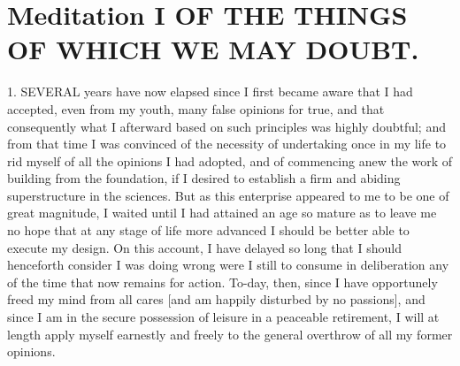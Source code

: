 
\section{Meditation I OF THE THINGS OF WHICH WE MAY DOUBT.}

1. SEVERAL years have now elapsed since I first became aware that I had accepted, even from my youth, many false opinions for true, and that consequently what I afterward based on such principles was highly doubtful; and from that time I was convinced of the necessity of undertaking once in my life to rid myself of all the opinions I had adopted, and of commencing anew the work of building from the foundation, if I desired to establish a firm and abiding superstructure in the sciences. But as this enterprise appeared to me to be one of great magnitude, I waited until I had attained an age so mature as to leave me no hope that at any stage of life more advanced I should be better able to execute my design. On this account, I have delayed so long that I should henceforth consider I was doing wrong were I still to consume in deliberation any of the time that now remains for action. To-day, then, since I have opportunely freed my mind from all cares [and am happily disturbed by no passions], and since I am in the secure possession of leisure in a peaceable retirement, I will at length apply myself earnestly and freely to the general overthrow of all my former opinions.

